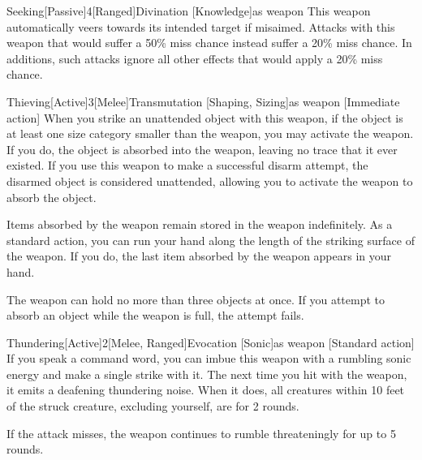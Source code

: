         \begin{magicitemdef}{Seeking}[Passive]{4}[Ranged]{Divination [Knowledge]}{as weapon}
             This weapon automatically veers towards its intended target if misaimed.
            Attacks with this weapon that would suffer a 50\% miss chance instead suffer a 20\% miss chance.
            In additions, such attacks ignore all other effects that would apply a 20\% miss chance.
        \end{magicitemdef}

        \begin{magicitemdef}{Thieving}[Active]{3}[Melee]{Transmutation [Shaping, Sizing]}{as weapon}
            [Immediate action] When you strike an unattended object with this weapon, if the object is at least one size category smaller than the weapon, you may activate the weapon.
            If you do, the object is absorbed into the weapon, leaving no trace that it ever existed.
            If you use this weapon to make a successful disarm attempt, the disarmed object is considered unattended, allowing you to activate the weapon to absorb the object.

             Items absorbed by the weapon remain stored in the weapon indefinitely.
            As a standard action, you can run your hand along the length of the striking surface of the weapon.
            If you do, the last item absorbed by the weapon appears in your hand.

            The weapon can hold no more than three objects at once.
            If you attempt to absorb an object while the weapon is full, the attempt fails.
        \end{magicitemdef}

        \begin{magicitemdef}{Thundering}[Active]{2}[Melee, Ranged]{Evocation [Sonic]}{as weapon}
            [Standard action] If you speak a command word, you can imbue this weapon with a rumbling sonic energy and make a single strike with it.
            The next time you hit with the weapon, it emits a deafening thundering noise.
            When it does, all creatures within 10 feet of the struck creature, excluding yourself, are \deafened for 2 rounds.

            If the attack misses, the weapon continues to rumble threateningly for up to 5 rounds.
        \end{magicitemdef}

